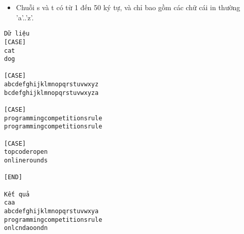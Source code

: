 \begin{itemize}
	\item     Chuỗi s và t có từ 1 đến 50 ký tự, và chỉ bao gồm các chữ cái in thường 'a'..'z'.   
\end{itemize}
\begin{verbatim}
Dữ liệu
[CASE]
cat
dog

[CASE]
abcdefghijklmnopqrstuvwxyz
bcdefghijklmnopqrstuvwxyza

[CASE]
programmingcompetitionsrule
programmingcompetitionsrule

[CASE]
topcoderopen
onlinerounds

[END]

Kết quả
caa
abcdefghijklmnopqrstuvwxya
programmingcompetitionsrule
onlcndaoondn
\end{verbatim}